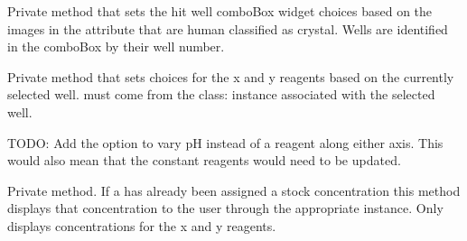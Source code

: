 \documentclass[letterpaper,10pt,english]{sphinxmanual}
\begin{document}
\begin{fulllineitems}
\begin{fulllineitems}
\end{fulllineitems}


\begin{fulllineitems}
\label{\detokenize{polo.widgets:polo.widgets.optimize_widget.OptimizeWidget._set_hit_well_choices}}
Private method that sets the hit well comboBox widget choices 
based on the images in the {\hyperref[\detokenize{polo.widgets:polo.widgets.optimize_widget.OptimizeWidget.run}]{}} attribute that 
are human classified as crystal.
Wells are identified in the comboBox by their well number.

\end{fulllineitems}


\begin{fulllineitems}
\label{\detokenize{polo.widgets:polo.widgets.optimize_widget.OptimizeWidget._set_reagent_choices}}
Private method that sets  choices for the x and y reagents
based on the currently selected well.  must come from the
class: instance associated with the selected well.

TODO: Add the option to vary pH instead of a reagent along either
axis. This would also mean that the constant reagents would need to
be updated.

\end{fulllineitems}


\begin{fulllineitems}
\label{\detokenize{polo.widgets:polo.widgets.optimize_widget.OptimizeWidget._set_reagent_stock_con}}
Private method. If a  has already been assigned a 
stock concentration this method displays that concentration to the user 
through the appropriate  instance.
Only displays concentrations for the x and y reagents.


\end{fulllineitems}
\end{fulllineitems}
\end{document}
